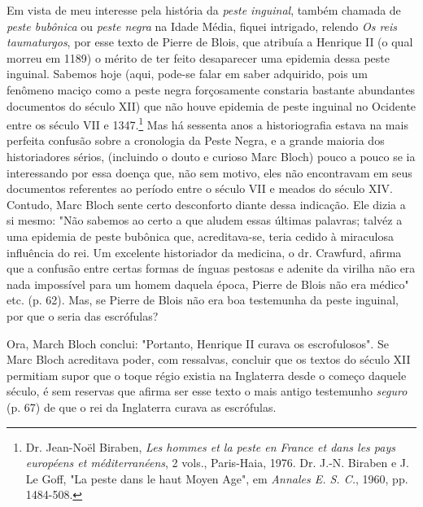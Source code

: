 \documentclass[a5paper]{book}
\begin{document}
Em vista de meu interesse pela história da \textit{peste inguinal}, também chamada de \textit{peste bubônica} ou \textit{peste negra} na Idade Média, fiquei intrigado, relendo \textit{Os reis taumaturgos}, por esse texto de Pierre de Blois, que atribuía a Henrique II (o qual morreu em 1189) o mérito de ter feito desaparecer uma epidemia dessa peste inguinal. Sabemos hoje (aqui, pode-se falar em saber adquirido, pois um fenômeno maciço como a peste negra forçosamente constaria bastante abundantes documentos do século XII) que não houve epidemia de peste inguinal no Ocidente entre os século VII e 1347.\footnote{Dr. Jean-Noël Biraben, \textit{Les hommes et la peste en France et dans les pays européens et méditerranéens}, 2 vols., Paris-Haia, 1976. Dr. J.-N. Biraben e J. Le Goff, "La peste dans le haut Moyen Age", em \textit{Annales E. S. C.}, 1960, pp. 1484-508.} Mas há sessenta anos a historiografia estava na mais perfeita confusão sobre a cronologia da Peste Negra, e a grande maioria dos historiadores sérios, (incluindo o douto e curioso Marc Bloch) pouco a pouco se ia interessando por essa doença que, não sem motivo, eles não encontravam em seus documentos referentes ao período entre o século VII e meados do século XIV. Contudo, Marc Bloch sente certo desconforto diante dessa indicação. Ele dizia a si mesmo: "Não sabemos ao certo a que aludem essas últimas palavras; talvéz a uma epidemia de peste bubônica que, acreditava-se, teria cedido à miraculosa influência do rei. Um excelente historiador da medicina, o dr. Crawfurd, afirma que a confusão entre certas formas de ínguas pestosas e adenite da virilha não era nada impossível para um homem daquela época, Pierre de Blois não era médico" etc. (p. 62). Mas, se Pierre de Blois não era boa testemunha da peste inguinal, por que o seria das escrófulas?

Ora, March Bloch conclui: "Portanto, Henrique II curava os escrofulosos". Se Marc Bloch acreditava poder, com ressalvas, concluir que os textos do século XII permitiam supor que o toque régio existia na Inglaterra desde o começo daquele século, é sem reservas que afirma ser esse texto o mais antigo testemunho \textit{seguro} (p. 67) de que o rei da Inglaterra curava as escrófulas.
\end{document}
